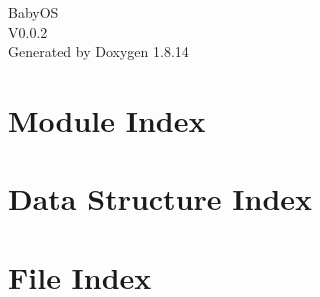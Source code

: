 \documentclass[twoside]{book}
\newcommand{\+}{\discretionary{\mbox{\scriptsize$\hookleftarrow$}}{}{}}
\newcommand{\clearemptydoublepage}{%
  \newpage{\pagestyle{empty}\cleardoublepage}%
}
\begin{document}
\hypersetup{pageanchor=false,
             bookmarksnumbered=true,
             pdfencoding=unicode
            }
\begin{titlepage}
\vspace*{7cm}
\begin{center}%
{\Large Baby\+OS \\[1ex]\large V0.\+0.\+2 }\\
\vspace*{1cm}
{\large Generated by Doxygen 1.8.14}\\
\end{center}
\end{titlepage}
\clearemptydoublepage
{}
\tableofcontents
\clearemptydoublepage
{}
\hypersetup{pageanchor=true}

\chapter{Module Index}

\chapter{Data Structure Index}

\chapter{File Index}

\end{document}
